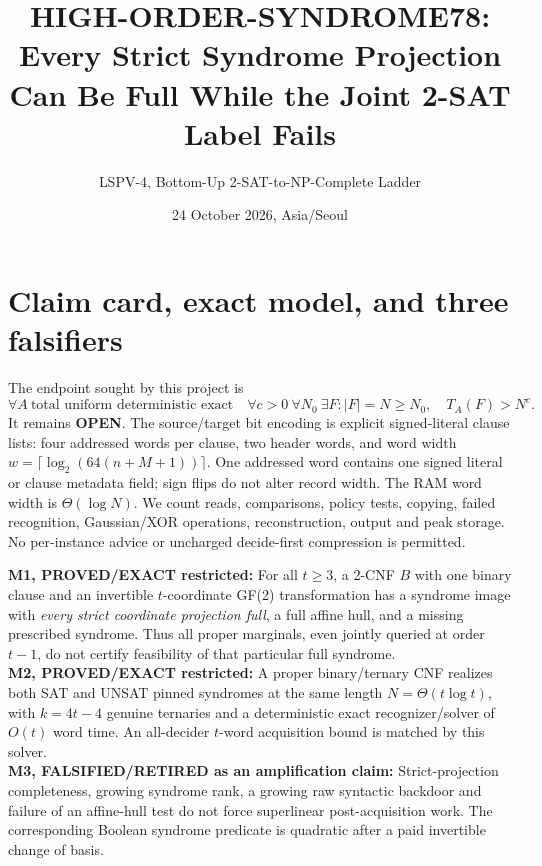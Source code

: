 \documentclass[11pt]{article}
\title{HIGH-ORDER-SYNDROME78:\\Every Strict Syndrome Projection Can Be Full While the Joint 2-SAT Label Fails}
\author{LSPV-4, Bottom-Up 2-SAT-to-NP-Complete Ladder}
\date{24 October 2026, Asia/Seoul}
\begin{document}
\maketitle
\begin{center}\end{center}

\section{Claim card, exact model, and three falsifiers}
The endpoint sought by this project is
\[
\forall A\ \text{total uniform deterministic exact}\quad
\forall c>0\ \forall N_0\ \exists F:
|F|=N\ge N_0,\quad T_A(F)>N^c. \tag{1}
\]
It remains \textbf{OPEN}. The source/target bit encoding is explicit signed-literal clause lists: four addressed words per clause, two header words, and word width
\(w=\lceil\log_2(64(n+M+1))\rceil\). One addressed word contains one signed literal or clause metadata field; sign flips do not alter record width. The RAM word width is \(\Theta(\log N)\). We count reads, comparisons, policy tests, copying, failed recognition, Gaussian/XOR operations, reconstruction, output and peak storage. No per-instance advice or uncharged decide-first compression is permitted.

\noindent\textbf{M1, PROVED/EXACT restricted:} For all \(t\ge3\), a 2-CNF \(B\) with one binary clause and an invertible \(t\)-coordinate GF(2) transformation has a syndrome image with \emph{every strict coordinate projection full}, a full affine hull, and a missing prescribed syndrome. Thus all proper marginals, even jointly queried at order \(t-1\), do not certify feasibility of that particular full syndrome.\\
\textbf{M2, PROVED/EXACT restricted:} A proper binary/ternary CNF realizes both SAT and UNSAT pinned syndromes at the same length \(N=\Theta(t\log t)\), with \(k=4t-4\) genuine ternaries and a deterministic exact recognizer/solver of \(O(t)\) word time. An all-decider \(t\)-word acquisition bound is matched by this solver.\\
\textbf{M3, FALSIFIED/RETIRED as an amplification claim:} Strict-projection completeness, growing syndrome rank, a growing raw syntactic backdoor and failure of an affine-hull test do not force superlinear post-acquisition work. The corresponding Boolean syndrome predicate is quadratic after a paid invertible change of basis.
\end{document}

